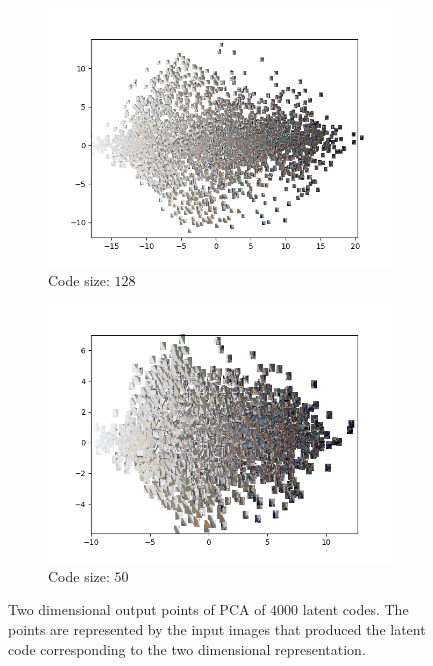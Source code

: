 \begin{figure}[H]
\begin{subfigure}{.5\textwidth}
        \centering
        \includegraphics[width=\textwidth]{images/figures/experiments_latent/convolutional_dim1024_PCA_images.png}   
        \caption{Code size: $128$}
    \end{subfigure}%
    \begin{subfigure}{.5\textwidth}
        \centering
        \includegraphics[width=\textwidth]{images/figures/experiments_latent/convolutional_dim50_PCA_images.png}
        \caption{Code size: $50$}
    \end{subfigure}
    \caption{Two dimensional output points of PCA of $4000$ latent codes. The points are represented by the input
    images that produced the latent code corresponding to the two dimensional representation.}
\end{figure}

